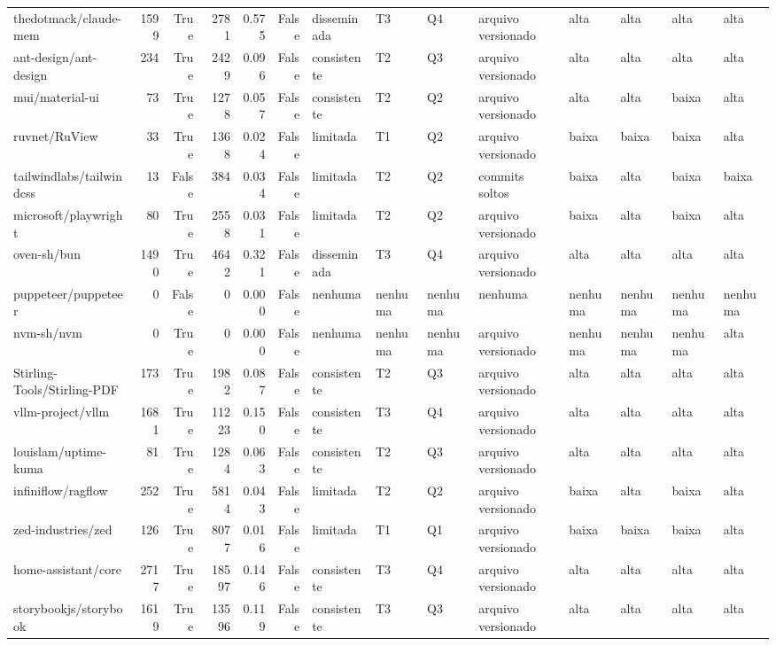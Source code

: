 \begin{tabular}{lrrrrrllllllll}
thedotmack/claude-mem & 1599 & True & 2781 & 0.575 & False & disseminada & T3 & Q4 & arquivo versionado & alta & alta & alta & alta \\
ant-design/ant-design & 234 & True & 2429 & 0.096 & False & consistente & T2 & Q3 & arquivo versionado & alta & alta & alta & alta \\
mui/material-ui & 73 & True & 1278 & 0.057 & False & consistente & T2 & Q2 & arquivo versionado & alta & alta & baixa & alta \\
ruvnet/RuView & 33 & True & 1368 & 0.024 & False & limitada & T1 & Q2 & arquivo versionado & baixa & baixa & baixa & alta \\
tailwindlabs/tailwindcss & 13 & False & 384 & 0.034 & False & limitada & T2 & Q2 & commits soltos & baixa & alta & baixa & baixa \\
microsoft/playwright & 80 & True & 2558 & 0.031 & False & limitada & T2 & Q2 & arquivo versionado & baixa & alta & baixa & alta \\
oven-sh/bun & 1490 & True & 4642 & 0.321 & False & disseminada & T3 & Q4 & arquivo versionado & alta & alta & alta & alta \\
puppeteer/puppeteer & 0 & False & 0 & 0.000 & False & nenhuma & nenhuma & nenhuma & nenhuma & nenhuma & nenhuma & nenhuma & nenhuma \\
nvm-sh/nvm & 0 & True & 0 & 0.000 & False & nenhuma & nenhuma & nenhuma & arquivo versionado & nenhuma & nenhuma & nenhuma & alta \\
Stirling-Tools/Stirling-PDF & 173 & True & 1982 & 0.087 & False & consistente & T2 & Q3 & arquivo versionado & alta & alta & alta & alta \\
vllm-project/vllm & 1681 & True & 11223 & 0.150 & False & consistente & T3 & Q4 & arquivo versionado & alta & alta & alta & alta \\
louislam/uptime-kuma & 81 & True & 1284 & 0.063 & False & consistente & T2 & Q3 & arquivo versionado & alta & alta & alta & alta \\
infiniflow/ragflow & 252 & True & 5814 & 0.043 & False & limitada & T2 & Q2 & arquivo versionado & baixa & alta & baixa & alta \\
zed-industries/zed & 126 & True & 8077 & 0.016 & False & limitada & T1 & Q1 & arquivo versionado & baixa & baixa & baixa & alta \\
home-assistant/core & 2717 & True & 18597 & 0.146 & False & consistente & T3 & Q4 & arquivo versionado & alta & alta & alta & alta \\
storybookjs/storybook & 1619 & True & 13596 & 0.119 & False & consistente & T3 & Q3 & arquivo versionado & alta & alta & alta & alta \\

\end{tabular}
